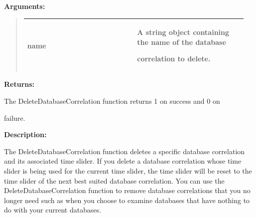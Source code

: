 \documentclass[letterpaper,10pt,english]{sphinxmanual}
\begin{document}
\begin{DUlineblock}{0em}
\item[] 
\item[] \textbf{Arguments:}
\end{DUlineblock}
\begin{quote}

\begin{tabular}{|p{0.475\linewidth}|p{0.475\linewidth}|}
\hline

name
 & 
\begin{DUlineblock}{0em}
\item[] A string object containing the name of the database
\item[] correlation to delete.
\end{DUlineblock}
\\
\hline\end{tabular}

\end{quote}

\begin{DUlineblock}{0em}
\item[] 
\item[] \textbf{Returns:}
\item[] The DeleteDatabaseCorrelation function returns 1 on success and 0 on
\item[] failure.
\item[] 
\item[] \textbf{Description:}
\item[] The DeleteDatabaseCorrelation function deletes a specific database
correlation and its associated time slider. If you delete a database
correlation whose time slider is being used for the current time slider,
the time slider will be reset to the time slider of the next best suited
database correlation. You can use the DeleteDatabaseCorrelation function to
remove database correlations that you no longer need such as when you
choose to examine databases that have nothing to do with your current
databases.
\end{DUlineblock}

\begin{DUlineblock}{0em}
\item[] 
\end{DUlineblock}
\end{document}

